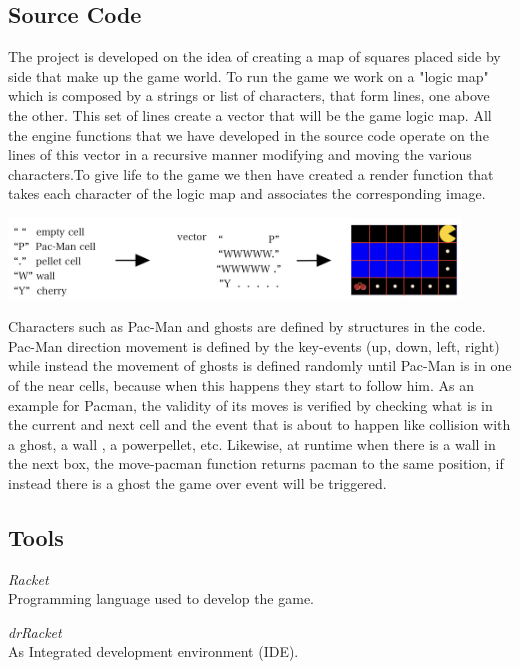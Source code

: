 \documentclass{article}
\begin{document}
 \subsection{Source Code}
 The project is developed on the idea of creating a map of squares placed side by side that make up the game world. To run the game we work on a "logic map" which is composed by a strings or list of characters, that form lines, one above the other. This set of lines create a vector that will be the game logic map. All the engine functions that we have developed in the source code operate on the lines of this vector in a recursive manner modifying and moving the various characters.To give life to the game we then have created a render function that takes each character of the logic map and associates the corresponding image.\\
 
 \begin{center}
 \includegraphics[width=12cm]{./images/vector.jpeg}
 \end{center}

 Characters such as Pac-Man and ghosts are defined by structures in the code. Pac-Man direction movement is defined by the key-events (up, down, left, right) while instead the movement of ghosts is defined randomly until Pac-Man is in one of the near cells, because when this happens they start to follow him.
 As an example for Pacman, the validity of its moves is verified by checking what is in the current and next cell and the event that is about to happen like collision with a ghost, a wall , a powerpellet, etc. Likewise, at runtime when there is a wall in the next box, the move-pacman function returns pacman to the same position, if instead there is a ghost the game over event will be triggered.
 
 \subsection{Tools}
 
 \hspace{0.5cm}\textit{Racket}\\
 Programming language used to develop the game.

 \textit{drRacket}\\
 As Integrated development environment (IDE).
 
\end{document}

